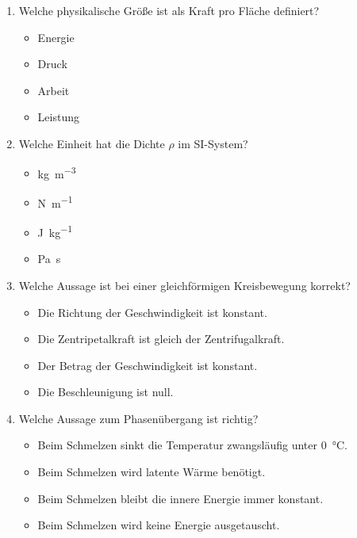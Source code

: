 \documentclass[11pt, a4paper]{article}
\begin{document}
\begin{enumerate}[label=\arabic*.,itemsep=18pt]
    \item Welche physikalische Größe ist als Kraft pro Fläche definiert?
    \begin{itemize}[label={$\square$},itemsep=1pt,topsep=0pt]
        \item Energie
        \item Druck
        \item Arbeit
        \item Leistung
    \end{itemize}

    \item Welche Einheit hat die Dichte $\rho$ im SI-System?
    \begin{itemize}[label={$\square$},itemsep=1pt,topsep=0pt]
        \item \si{\kilogram\per\metre\cubed}
        \item \si{\newton\per\metre}
        \item \si{\joule\per\kilogram}
        \item \si{\pascal\second}
    \end{itemize}

    \item Welche Aussage ist bei einer gleichförmigen Kreisbewegung korrekt?
    \begin{itemize}[label={$\square$},itemsep=1pt,topsep=0pt]
        \item Die Richtung der Geschwindigkeit ist konstant.
        \item Die Zentripetalkraft ist gleich der Zentrifugalkraft.
        \item Der Betrag der Geschwindigkeit ist konstant.
        \item Die Beschleunigung ist null.
    \end{itemize}

    \item Welche Aussage zum Phasenübergang  ist richtig?
    \begin{itemize}[label={$\square$},itemsep=1pt,topsep=0pt]
        \item Beim Schmelzen sinkt die Temperatur zwangsläufig unter \SI{0}{\degreeCelsius}.
        \item Beim Schmelzen wird latente Wärme benötigt.
        \item Beim Schmelzen bleibt die innere Energie immer konstant.
        \item Beim Schmelzen wird keine Energie ausgetauscht.
    \end{itemize}


\end{enumerate}
\end{document}
